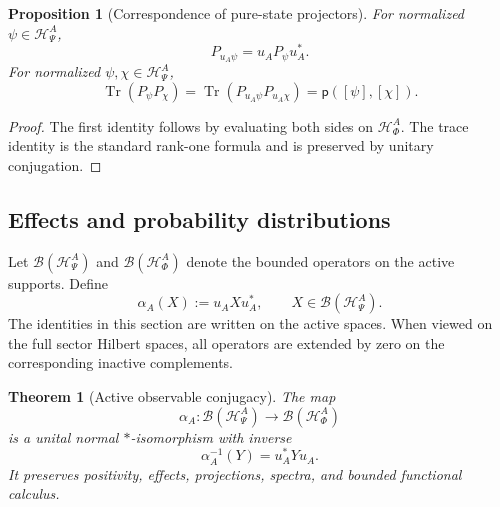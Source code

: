 \documentclass[11pt,reqno]{scrartcl}
\newcommand{\polA}{u_A}
\newcommand{\actHP}{\mathscr H_{\Psi}^{A}}
\newcommand{\actHF}{\mathscr H_{\Phi}^{A}}
\newcommand{\alphaA}{\alpha_{A}}
\newcommand{\BRprob}{\mathsf p}
\DeclareMathOperator{\Tr}{Tr}
\theoremstyle{plain}
\newtheorem{theorem}{Theorem}[section]
\newtheorem{proposition}[proposition]{Proposition}
\theoremstyle{definition}
\theoremstyle{remark}
\begin{document}
\begin{proposition}[Correspondence of pure-state projectors]
\label{prop:pure-projector-correspondence}
For normalized \(\psi\in\actHP\),
\begin{equation}
  \boxed{
  P_{\polA\psi}=\polA P_\psi\polA^*.}
  \label{eq:pure-projector-conjugation}
\end{equation}
For normalized \(\psi,\chi\in\actHP\),
\begin{equation}
  \Tr(P_\psi P_\chi)
  =\Tr(P_{\polA\psi}P_{\polA\chi})
  =\BRprob([\psi],[\chi]).
  \label{eq:projector-transition-trace}
\end{equation}
\end{proposition}

\begin{proof}
The first identity follows by evaluating both sides on \(\actHF\).  The trace
identity is the standard rank-one formula and is preserved by unitary
conjugation.
\end{proof}

\subsection{Effects and probability distributions}

Let \(\mathcal B(\actHP)\) and \(\mathcal B(\actHF)\) denote the bounded
operators on the active supports.  Define
\begin{equation}
  \boxed{
  \alphaA(X):=\polA X\polA^*,
  \qquad
  X\in\mathcal B(\actHP).}
  \label{eq:alphaA-definition}
\end{equation}
The identities in this section are written on the active spaces.  When viewed
on the full sector Hilbert spaces, all operators are extended by zero on the
corresponding inactive complements.

\begin{theorem}[Active observable conjugacy]
\label{thm:alphaA-star-isomorphism}
The map
\begin{equation}
  \alphaA:\mathcal B(\actHP)\longrightarrow\mathcal B(\actHF)
  \label{eq:alphaA-map}
\end{equation}
is a unital normal \(*\)-isomorphism with inverse
\begin{equation}
  \alphaA^{-1}(Y)=\polA^*Y\polA.
  \label{eq:alphaA-inverse}
\end{equation}
It preserves positivity, effects, projections, spectra, and bounded
functional calculus.
\end{theorem}
\end{document}
